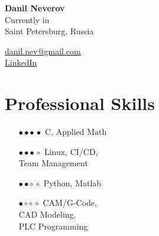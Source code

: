 \documentclass[a4paper,10pt]{article}
\def\CC{{C\nolinebreak[4]\hspace{-.05em}\raisebox{.4ex}{\tiny\bf ++}}}
\begin{document}
\thispagestyle{empty}

\begin{adjustbox}{valign=t}
\begin{minipage}{0.3\textwidth} %

\begin{center}
\vspace{10 pt}

{\LARGE \bfseries Danil Neverov}\\
\vspace{10 pt}
Currently in\\
Saint Petersburg, Russia

\textcolor{ColorTwo}{\faEnvelopeO} 
\href{mailto:danil.nev@gmail.com}{danil.nev@gmail.com} \\
\textcolor{ColorTwo}{\faChain} 
\href{https://www.linkedin.com/in/danil-neverov-37567066/}{LinkedIn}
\end{center}
\vfill

\section*{Professional Skills}
\raggedright
\begin{enumerate}[align = left, labelwidth = 4em, leftmargin = \dimexpr\labelwidth + \labelsep\relax]
	\item [\textcolor{ColorOne}{$\bullet \bullet \bullet \, \bullet $}] \CC, Applied Math
	\item [\textcolor{ColorOne}{$\bullet \bullet \bullet \, \circ $}] Linux, CI/CD, \\Team Management
	\item [\textcolor{ColorOne}{$\bullet \bullet \circ \, \circ $}] Python, Matlab
	\item [\textcolor{ColorOne}{$\bullet \circ \circ \, \circ $}] CAM/G-Code, \\CAD Modeling, \\PLC Programming
\end{enumerate}
\vfill


\end{minipage}
\end{adjustbox}
\end{document}
